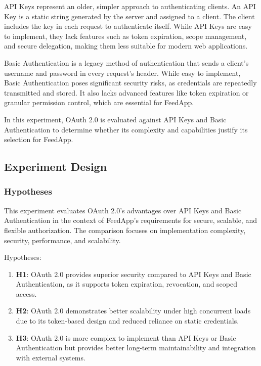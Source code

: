 API Keys represent an older, simpler approach to authenticating clients. An API Key is a static string generated by the server and assigned to a client. The client includes the key in each request to authenticate itself. While API Keys are easy to implement, they lack features such as token expiration, scope management, and secure delegation, making them less suitable for modern web applications.

Basic Authentication is a legacy method of authentication that sends a client’s username and password in every request’s header. While easy to implement, Basic Authentication poses significant security risks, as credentials are repeatedly transmitted and stored. It also lacks advanced features like token expiration or granular permission control, which are essential for FeedApp.

In this experiment, OAuth 2.0 is evaluated against API Keys and Basic Authentication to determine whether its complexity and capabilities justify its selection for FeedApp.

\subsection{Experiment Design}

\subsubsection*{Hypotheses}
This experiment evaluates OAuth 2.0's advantages over API Keys and Basic Authentication in the context of FeedApp’s requirements for secure, scalable, and flexible authorization. The comparison focuses on implementation complexity, security, performance, and scalability.

Hypotheses:


\begin{enumerate}
    \item \textbf{H1}: OAuth 2.0 provides superior security compared to API Keys and Basic Authentication, as it supports token expiration, revocation, and scoped access.

    \item \textbf{H2}: OAuth 2.0 demonstrates better scalability under high concurrent loads due to its token-based design and reduced reliance on static credentials.

    \item \textbf{H3}: OAuth 2.0 is more complex to implement than API Keys or Basic Authentication but provides better long-term maintainability and integration with external systems.
\end{enumerate}

